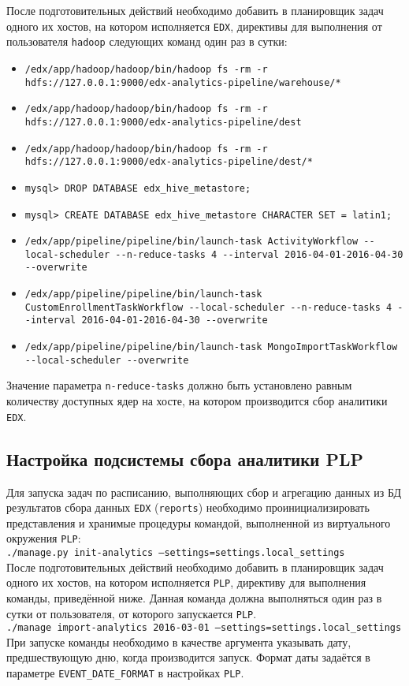 После подготовительных действий необходимо добавить в планировщик задач одного их хостов, на котором исполняется \texttt{EDX}, директивы для выполнения от пользователя \texttt{hadoop} следующих команд один раз в сутки:
\begin{sloppypar}
\begin{itemize}
	\item \texttt{/edx/app/hadoop/hadoop/bin/hadoop fs -rm -r hdfs://127.0.0.1:9000/edx-analytics-pipeline/warehouse/*}
	\item \texttt{/edx/app/hadoop/hadoop/bin/hadoop fs -rm -r hdfs://127.0.0.1:9000/edx-analytics-pipeline/dest}
	\item \texttt{/edx/app/hadoop/hadoop/bin/hadoop fs -rm -r hdfs://127.0.0.1:9000/edx-analytics-pipeline/dest/*}
	\item \texttt{mysql> DROP DATABASE edx\_hive\_metastore;}
	\item \texttt{mysql> CREATE DATABASE edx\_hive\_metastore CHARACTER SET = latin1;}
	\item \texttt{/edx/app/pipeline/pipeline/bin/launch-task ActivityWorkflow -{}-local-scheduler -{}-n-reduce-tasks 4 -{}-interval 2016-04-01-2016-04-30 -{}-overwrite}
	\item \texttt{/edx/app/pipeline/pipeline/bin/launch-task CustomEnrollmentTaskWorkflow -{}-local-scheduler -{}-n-reduce-tasks 4 -{}-interval 2016-04-01-2016-04-30 -{}-overwrite}
	\item \texttt{/edx/app/pipeline/pipeline/bin/launch-task MongoImportTaskWorkflow -{}-local-scheduler -{}-overwrite}
\end{itemize}
\end{sloppypar}
Значение параметра \texttt{n-reduce-tasks} должно быть установлено равным количеству доступных ядер на хосте, на котором производится сбор аналитики \texttt{EDX}.

\subsection{Настройка подсистемы сбора аналитики PLP}
Для запуска задач по расписанию, выполняющих сбор и агрегацию данных из БД результатов сбора данных \texttt{EDX} (\texttt{reports}) необходимо проинициализировать представления и хранимые процедуры командой, выполненной из виртуального окружения \texttt{PLP}:\\
	\texttt{./manage.py init-analytics --settings=settings.local\_settings}\\
После подготовительных действий необходимо добавить в планировщик задач одного их хостов, на котором исполняется \texttt{PLP}, директиву для выполнения команды, приведённой ниже. Данная команда должна выполняться один раз в сутки от пользователя, от которого запускается \texttt{PLP}.\\
	\texttt{./manage import-analytics 2016-03-01 --settings=settings.local\_settings}\\
При запуске команды необходимо в качестве аргумента указывать дату, предшествующую дню, когда производится запуск. Формат даты задаётся в параметре \texttt{EVENT\_DATE\_FORMAT} в настройках \texttt{PLP}.

